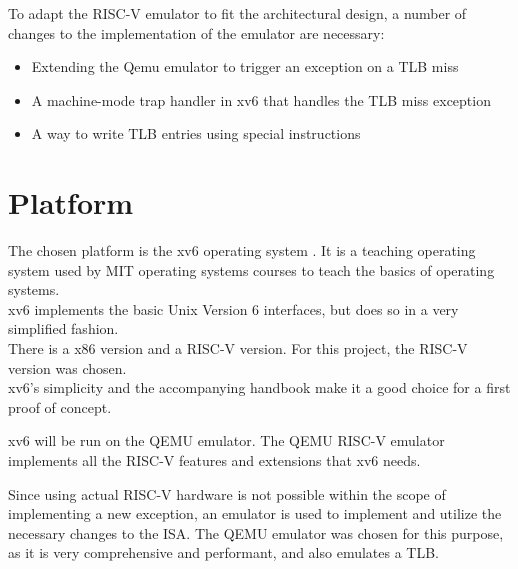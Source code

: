To adapt the RISC-V emulator to fit the architectural design, a number of changes to the implementation of the emulator are necessary:

\begin{itemize}
    \item Extending the Qemu emulator to trigger an exception on a TLB miss
    \item A machine-mode trap handler in xv6 that handles the TLB miss exception
    \item A way to write TLB entries using special instructions
\end{itemize}


\section{Platform}
The chosen platform is the xv6 operating system \cite{xv6source}. It is a teaching operating system
used by MIT operating systems courses to teach the basics of operating systems.\\
xv6 implements the basic Unix Version 6 interfaces, but does so in a very simplified fashion.\\
There is a x86 version and a RISC-V version. For this project, the RISC-V version was chosen.\\
xv6's simplicity and the accompanying handbook \cite{cox2011xv6} make it a good choice for a first
proof of concept.

xv6 will be run on the QEMU \cite{QEMUSource2024} emulator. The QEMU RISC-V emulator implements
all the RISC-V features and extensions that xv6 needs.

Since using actual RISC-V hardware is not possible within the scope of implementing a new exception, an emulator is used to implement and utilize the necessary changes to the ISA. The QEMU emulator was chosen for this purpose, as it is very comprehensive and performant, and also emulates a TLB.




